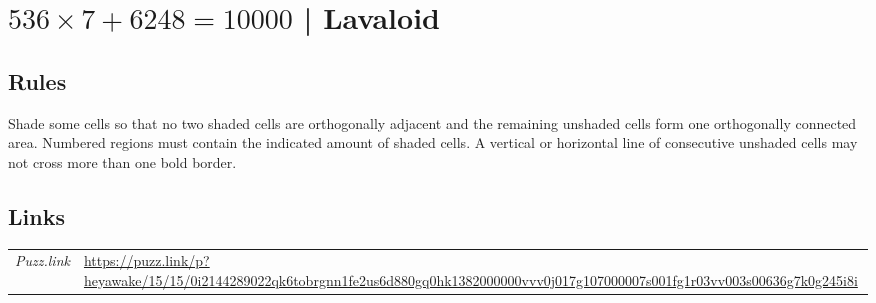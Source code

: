 \section{$536 \times 7 + 6248 = 10000$ | {\normalfont Lavaloid}}
\label{sec:08-536-times-7-6248-10000-lavaloid}

\subsection*{Rules}
\begin{markdown}
Shade some cells so that no two shaded cells are orthogonally adjacent and the remaining unshaded cells form one orthogonally connected area. Numbered regions must contain the indicated amount of shaded cells. A vertical or horizontal line of consecutive unshaded cells may not cross more than one bold border.
\end{markdown}
\subsection*{Links}
\begin{tabularx}{\textwidth}{l X}
\emph{Puzz.link} & \url{https://puzz.link/p?heyawake/15/15/0i2144289022qk6tobrgnn1fe2us6d880gq0hk1382000000vvv0j017g107000007s001fg1r03vv003s00636g7k0g245i8i} \\
\end{tabularx}
\pagebreak
